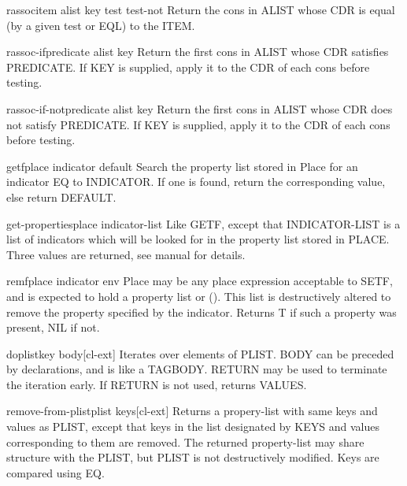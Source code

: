 \documentclass[10pt,english]{book}
\begin{document}
\begin{function}{rassoc}{item alist \key key test test-not}
  Return the cons in ALIST whose CDR is equal (by a given test or EQL) to
   the ITEM.
\end{function}

\begin{function}{rassoc-if}{predicate alist \key key}
  Return the first cons in ALIST whose CDR satisfies PREDICATE. If KEY
  is supplied, apply it to the CDR of each cons before testing.
\end{function}

\begin{function}{rassoc-if-not}{predicate alist \key key}
  Return the first cons in ALIST whose CDR does not satisfy PREDICATE.
  If KEY is supplied, apply it to the CDR of each cons before testing.
\end{function}

\begin{accessor}{getf}{place indicator \op default}
  Search the property list stored in Place for an indicator EQ to INDICATOR.
  If one is found, return the corresponding value, else return DEFAULT.
\end{accessor}

\begin{function}{get-properties}{place indicator-list}
  Like GETF, except that INDICATOR-LIST is a list of indicators which will
  be looked for in the property list stored in PLACE. Three values are
  returned, see manual for details.
\end{function}

\begin{macro}{remf}{place indicator \env env}
  Place may be any place expression acceptable to SETF, and is expected
  to hold a property list or (). This list is destructively altered to
  remove the property specified by the indicator. Returns T if such a
  property was present, NIL if not.
\end{macro}

\begin{macro}{doplist}{key \body body}[cl-ext]
  Iterates over elements of PLIST. BODY can be preceded by
declarations, and is like a TAGBODY. RETURN may be used to terminate
the iteration early. If RETURN is not used, returns VALUES.
\end{macro}

\begin{function}{remove-from-plist}{plist \rest keys}[cl-ext]
  Returns a propery-list with same keys and values as PLIST, except that keys
in the list designated by KEYS and values corresponding to them are removed.
The returned property-list may share structure with the PLIST, but PLIST is
not destructively modified. Keys are compared using EQ.
\end{function}
\end{document}
